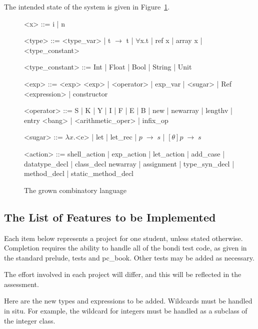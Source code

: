 \documentclass[12pt]{article}
\begin{document}
The intended state of the system is given in Figure~\ref{fig:gcomblang}.

\begin{figure}
  \begin{grammar}
<x> ::= i | n

<type> ::= <type_var> | t $\rightarrow$ t  | $\forall$x.t | ref x | array x | <type_constant>

<type_constant> ::= Int | Float | Bool | String | Unit

<exp> ::= <exp> <exp> | <operator> | exp_var | <sugar> | Ref <expression> | constructor

<operator> ::= S | K | Y | I | F | E | B | new | newarray | lengthv | entry 
\alt  <bang> | <arithmetic_oper>  | infix_op

<sugar> ::= $\lambda x.$<e> | let  | let_rec | $p \; \rightarrow \; s$ | $[\theta]p \; \rightarrow \; s$ 

<action> ::= shell_action | exp_action | let_action | add_case | datatype_decl | class_decl 
             \alt   newarray | assignment | type_syn_decl | method_decl | static_method_decl

\end{grammar}  
\caption{The grown combinatory language}
\label{fig:gcomblang}
\end{figure}


\subsection{The List of Features to be Implemented}

Each item below represents a project for one student, unless stated
otherwise. Completion requires the ability to handle all of the bondi
test code, as given in the standard prelude, tests and pc_book. Other
tests may be added as necessary. 


The effort involved in each project will differ, and this
will be reflected in the assessment.  

Here are the new types and expressions to be added. Wildcards must be
handled in situ. For example, the wildcard for integers 
must be handled as a subclass of the integer class. 
\end{document}
